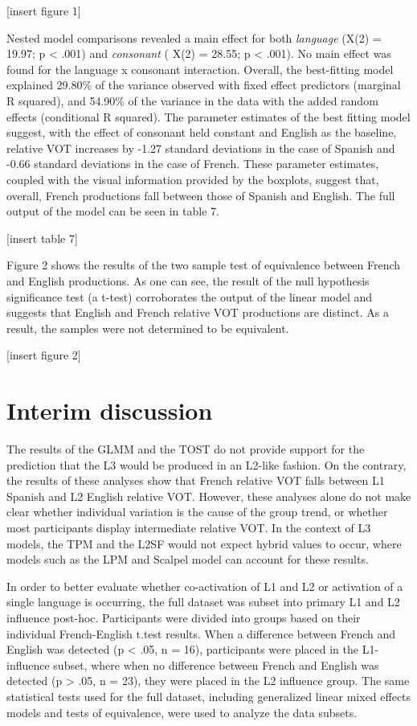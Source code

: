 \documentclass[
  english,
  man]{apa6}
\begin{document}
{[}insert figure 1{]}

Nested model comparisons revealed a main effect for both \emph{language} (X(2) = 19.97; p \textless{} .001) and \emph{consonant} (
X(2) = 28.55; p \textless{} .001).
No main effect was found for the language x consonant interaction.
Overall, the best-fitting model explained 29.80\% of the variance observed with fixed effect predictors (marginal R squared), and 54.90\% of the variance in the data with the added random effects (conditional R squared).
The parameter estimates of the best fitting model suggest, with the effect of consonant held constant and English as the baseline, relative VOT increases by -1.27 standard deviations in the case of Spanish and -0.66 standard deviations in the case of French.
These parameter estimates, coupled with the visual information provided by the boxplots, suggest that, overall, French productions fall between those of Spanish and English.
The full output of the model can be seen in table 7.

{[}insert table 7{]}

Figure 2 shows the results of the two sample test of equivalence between French and English productions.
As one can see, the result of the null hypothesis significance test (a t-test) corroborates the output of the linear model and suggests that English and French relative VOT productions are distinct.
As a result, the samples were not determined to be equivalent.

{[}insert figure 2{]}

\hypertarget{interim-discussion}{%
\section{Interim discussion}\label{interim-discussion}}

The results of the GLMM and the TOST do not provide support for the prediction that the L3 would be produced in an L2-like fashion.
On the contrary, the results of these analyses show that French relative VOT falls between L1 Spanish and L2 English relative VOT.
However, these analyses alone do not make clear whether individual variation is the cause of the group trend, or whether most participants display intermediate relative VOT.
In the context of L3 models, the TPM and the L2SF would not expect hybrid values to occur, where models such as the LPM and Scalpel model can account for these results.

In order to better evaluate whether co-activation of L1 and L2 or activation of a single language is occurring, the full dataset was subset into primary L1 and L2 influence post-hoc.
Participants were divided into groups based on their individual French-English t.test results.
When a difference between French and English was detected (p \textless{} .05, n = 16), participants were placed in the L1-influence subset, where when no difference between French and English was detected (p \textgreater{} .05, n = 23), they were placed in the L2 influence group.
The same statistical tests used for the full dataset, including generalized linear mixed effects models and tests of equivalence, were used to analyze the data subsets.
\end{document}
